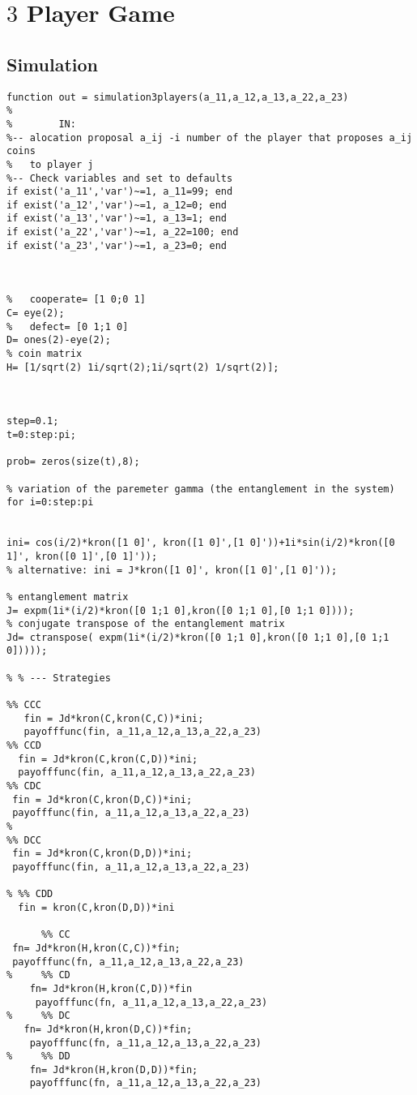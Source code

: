\label{ap:d}

\section{$3$ Player Game}

\subsection{Simulation}
\begin{lstlisting}
function out = simulation3players(a_11,a_12,a_13,a_22,a_23)
%
%        IN:
%-- alocation proposal a_ij -i number of the player that proposes a_ij coins 
%   to player j
%-- Check variables and set to defaults
if exist('a_11','var')~=1, a_11=99; end
if exist('a_12','var')~=1, a_12=0; end
if exist('a_13','var')~=1, a_13=1; end
if exist('a_22','var')~=1, a_22=100; end
if exist('a_23','var')~=1, a_23=0; end



%   cooperate= [1 0;0 1]
C= eye(2);
%   defect= [0 1;1 0]
D= ones(2)-eye(2);
% coin matrix
H= [1/sqrt(2) 1i/sqrt(2);1i/sqrt(2) 1/sqrt(2)];



step=0.1;
t=0:step:pi;

prob= zeros(size(t),8);

% variation of the paremeter gamma (the entanglement in the system)
for i=0:step:pi


ini= cos(i/2)*kron([1 0]', kron([1 0]',[1 0]'))+1i*sin(i/2)*kron([0 1]', kron([0 1]',[0 1]'));
% alternative: ini = J*kron([1 0]', kron([1 0]',[1 0]'));

% entanglement matrix
J= expm(1i*(i/2)*kron([0 1;1 0],kron([0 1;1 0],[0 1;1 0])));
% conjugate transpose of the entanglement matrix
Jd= ctranspose( expm(1i*(i/2)*kron([0 1;1 0],kron([0 1;1 0],[0 1;1 0]))));

% % --- Strategies

%% CCC 
   fin = Jd*kron(C,kron(C,C))*ini;
   payofffunc(fin, a_11,a_12,a_13,a_22,a_23)
%% CCD 
  fin = Jd*kron(C,kron(C,D))*ini;
  payofffunc(fin, a_11,a_12,a_13,a_22,a_23)
%% CDC 
 fin = Jd*kron(C,kron(D,C))*ini;
 payofffunc(fin, a_11,a_12,a_13,a_22,a_23)
% 
%% DCC 
 fin = Jd*kron(C,kron(D,D))*ini;
 payofffunc(fin, a_11,a_12,a_13,a_22,a_23)

% %% CDD 
  fin = kron(C,kron(D,D))*ini
  
      %% CC
 fn= Jd*kron(H,kron(C,C))*fin;
 payofffunc(fn, a_11,a_12,a_13,a_22,a_23)
%     %% CD
    fn= Jd*kron(H,kron(C,D))*fin 
     payofffunc(fn, a_11,a_12,a_13,a_22,a_23)
%     %% DC
   fn= Jd*kron(H,kron(D,C))*fin;
    payofffunc(fn, a_11,a_12,a_13,a_22,a_23)
%     %% DD
    fn= Jd*kron(H,kron(D,D))*fin; 
    payofffunc(fn, a_11,a_12,a_13,a_22,a_23)
  

\end{lstlisting}
